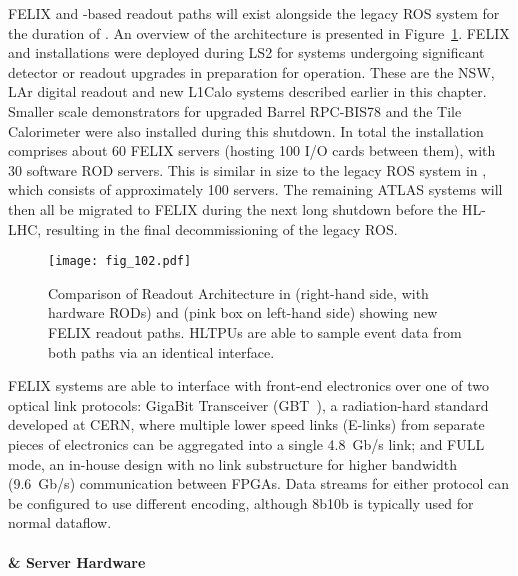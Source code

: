 \documentclass[cernpreprint, atlasdraft=false, UKenglish,british,orcidlogo, texmf, orcidlogo]{atlasdoc}
\begin{document}
\gls{FELIX} and \swrod-based readout paths will exist alongside the legacy \gls{ROS} system for the duration of \RunThr. An overview of the architecture is presented in Figure~\ref{fig:TDAQ_DAQHLT_Run3Arch}. \gls{FELIX} and \swrod installations were deployed during \gls{LS2} for systems undergoing significant detector or readout upgrades in preparation for \RunThr operation. These are the \gls{NSW}, \gls{LAr} digital readout and new \gls{L1Calo} systems described earlier in this chapter. Smaller scale demonstrators for upgraded Barrel \gls{RPC-BIS78} and the Tile Calorimeter were also installed during this shutdown. In total the \RunThr installation comprises about \num{60} \gls{FELIX} servers (hosting \num{100} I/O cards between them), with \num{30} software \gls{ROD} servers. This is similar in size to the legacy \gls{ROS} system in \RunThr, which consists of approximately \num{100} servers. The remaining ATLAS systems will then all be migrated to \gls{FELIX} 
during the next long shutdown before the \gls{HL-LHC}, resulting in the final decommissioning of the legacy \gls{ROS}.
 
\begin{figure}[htbp!]
\centerline{\texttt{[image: fig\_102.pdf]}}
\caption{Comparison of Readout Architecture in \RunTwo (right-hand side, with hardware \glspl{ROD}) and \RunThr (pink box on left-hand side) showing new \gls{FELIX} readout paths. \glspl{HLTPU} are able to sample event data from both paths via an identical interface.}
\label{fig:TDAQ_DAQHLT_Run3Arch}
\end{figure}
 
\gls{FELIX} systems are able to interface with front-end electronics over one of two optical link protocols: GigaBit Transceiver (GBT~\cite{WYLLIE20121561}), a radiation-hard standard developed at CERN, where multiple lower speed links (E-links) from separate pieces of electronics can be aggregated into a single \SI{4.8}{Gb/\s} link; and FULL mode, an in-house design with no link substructure for higher bandwidth (\SI{9.6}{Gb/\s}) communication between \glspl{FPGA}. Data streams for either protocol can be configured to use different encoding, although 8b10b is typically used for normal dataflow.
 
\paragraph{ \&  Server Hardware}
 
\end{document}
